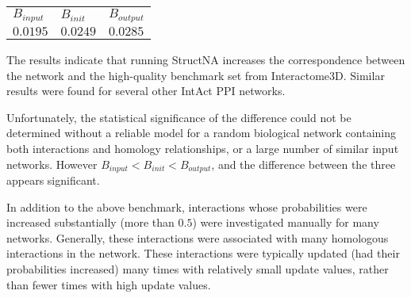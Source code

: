 \documentclass[12pt,twoside]{article}
\begin{document}
\begin{tabular}{lll}
$B_{input}$ & $B_{init}$ & $B_{output}$ \\
$0.0195$ & $0.0249$ & $0.0285$
\end{tabular}

The results indicate that running StructNA increases the correspondence between the network and the high-quality benchmark set from Interactome3D. Similar results were found for several other IntAct PPI networks.

Unfortunately, the statistical significance of the difference could not be determined without a reliable model for a random biological network containing both interactions and homology relationships, or a large number of similar input networks. However $B_{input} < B_{init} < B_{output}$, and the difference between the three appears significant.

In addition to the above benchmark, interactions whose probabilities were increased substantially (more than $0.5$) were investigated manually for many networks. Generally, these interactions were associated with many homologous interactions in the network. These interactions were typically updated (had their probabilities increased) many times with relatively small update values, rather than fewer times with high update values.



\end{document}
